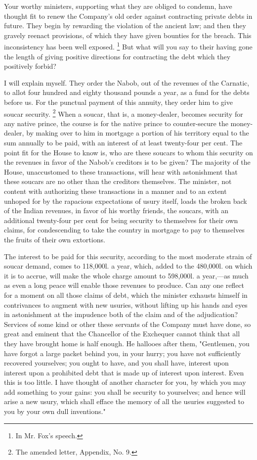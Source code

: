 Your worthy ministers, supporting what they are obliged to condemn, have thought fit to renew the Company's old order against contracting private debts in future. They begin by rewarding the violation of the ancient law; and then they gravely reenact provisions, of which they have given bounties for the breach. This inconsistency has been well exposed.
\footnote{ In Mr. Fox's speech.}
 But what will you say to their having gone the length of giving positive directions for contracting the debt which they positively forbid?

I will explain myself. They order the Nabob, out of the revenues of the Carnatic, to allot four hundred and eighty thousand pounds a year, as a fund for the debts before us. For the punctual payment of this annuity, they order him to give soucar security.
\footnote{ The amended letter, Appendix, No. 9.}
 When a soucar, that is, a money-dealer, becomes security for any native prince, the course is for the native prince to counter-secure the money-dealer, by making over to him in mortgage a portion of his territory equal to the sum annually to be paid, with an interest of at least twenty-four per cent. The point fit for the House to know is, who are these soucars to whom this security on the revenues in favor of the Nabob's creditors is to be given? The majority of the House, unaccustomed to these transactions, will hear with astonishment that these soucars are no other than the creditors themselves. The minister, not content with authorizing these transactions in a manner and to an extent unhoped for by the rapacious expectations of usury itself, loads the broken back of the Indian revenues, in favor of his worthy friends, the soucars, with an additional twenty-four per cent for being security to themselves for their own claims, for condescending to take the country in mortgage to pay to themselves the fruits of their own extortions.

The interest to be paid for this security, according to the most moderate strain of soucar demand, comes to 118,000l. a year, which, added to the 480,000l. on which it is to accrue, will make the whole charge amount to 598,000l. a year,—as much as even a long peace will enable those revenues to produce. Can any one reflect for a moment on all those claims of debt, which the minister exhausts himself in contrivances to augment with new usuries, without lifting up his hands and eyes in astonishment at the impudence both of the claim and of the adjudication? Services of some kind or other these servants of the Company must have done, so great and eminent that the Chancellor of the Exchequer cannot think that all they have brought home is half enough. He hallooes after them, "Gentlemen, you have forgot a large packet behind you, in your hurry; you have not sufficiently recovered yourselves; you ought to have, and you shall have, interest upon interest upon a prohibited debt that is made up of interest upon interest. Even this is too little. I have thought of another character for you, by which you may add something to your gains: you shall be security to yourselves; and hence will arise a new usury, which shall efface the memory of all the usuries suggested to you by your own dull inventions."

